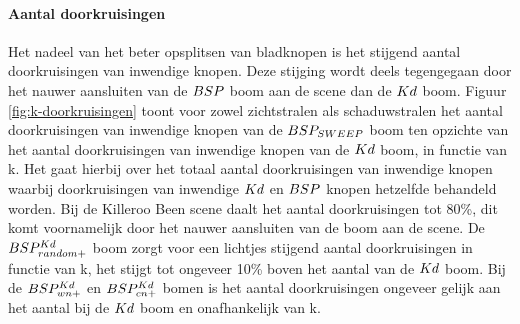 \begin{figure}
  \centering
  
\end{figure}

\paragraph{Aantal doorkruisingen}
Het nadeel van het beter opsplitsen van bladknopen is het stijgend aantal doorkruisingen van inwendige knopen.
Deze stijging wordt deels tegengegaan door het nauwer aansluiten van de $BSP$ boom aan de scene dan de $Kd$ boom.
Figuur \ref{fig:k-doorkruisingen} toont voor zowel zichtstralen als schaduwstralen het aantal doorkruisingen van inwendige knopen van de $BSP_{SWEEP}$ boom ten opzichte van het aantal doorkruisingen van inwendige knopen van de $Kd$ boom, in functie van k.
Het gaat hierbij over het totaal aantal doorkruisingen van inwendige knopen waarbij doorkruisingen van inwendige $Kd$ en $BSP$ knopen hetzelfde behandeld worden. 
Bij de Killeroo Been scene daalt het aantal doorkruisingen tot 80\%, dit komt voornamelijk door het nauwer aansluiten van de boom aan de scene.
De $BSP^{Kd}_{random+}$ boom zorgt voor een lichtjes stijgend aantal doorkruisingen in functie van k, het stijgt tot ongeveer 10\% boven het aantal van de $Kd$ boom.
Bij de $BSP^{Kd}_{wn+}$ en $BSP^{Kd}_{cn+}$ bomen is het aantal doorkruisingen ongeveer gelijk aan het aantal bij de $Kd$ boom en onafhankelijk van k.
